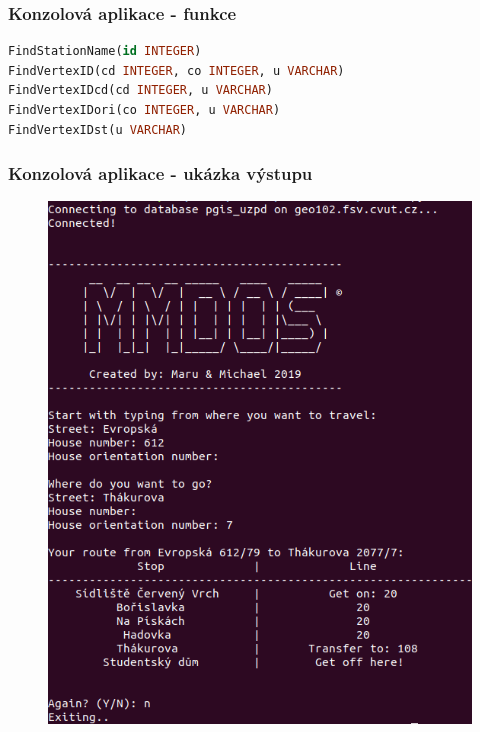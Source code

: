 \documentclass{beamer}
\begin{document}
\begin{frame}[fragile]
\frametitle{Konzolová aplikace - funkce}
\begin{exampleblock}{}
\begin{lstlisting}[language=sql]
FindStationName(id INTEGER)
FindVertexID(cd INTEGER, co INTEGER, u VARCHAR)
FindVertexIDcd(cd INTEGER, u VARCHAR)
FindVertexIDori(co INTEGER, u VARCHAR)
FindVertexIDst(u VARCHAR)
\end{lstlisting}
\end{exampleblock}
\end{frame}

\begin{frame}
\frametitle{Konzolová aplikace - ukázka výstupu}

\begin{figure}[h]
\includegraphics[scale=0.35]{ukazka.png}
\end{figure}
\end{frame}
\end{document}

